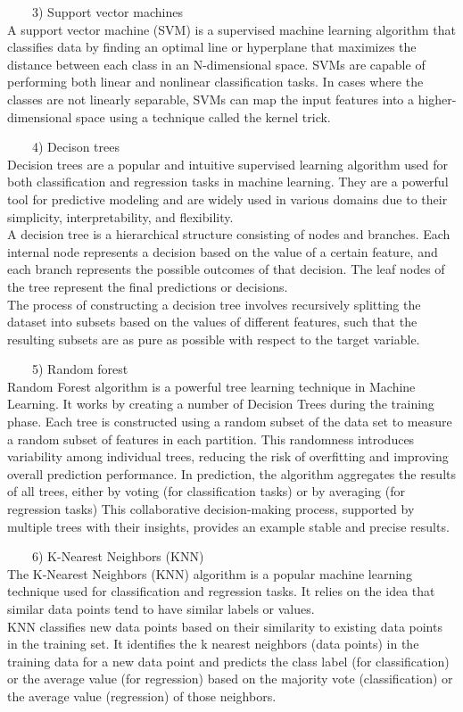 \documentclass[
]{book}
\begin{document}
~~~~3) Support vector machines\\
A support vector machine (SVM) is a supervised machine learning algorithm that classifies data by finding an optimal line or hyperplane that maximizes the distance between each class in an N-dimensional space.
SVMs are capable of performing both linear and nonlinear classification tasks. In cases where the classes are not linearly separable, SVMs can map the input features into a higher-dimensional space using a technique called the kernel trick.

~~~~4) Decison trees\\
Decision trees are a popular and intuitive supervised learning algorithm used for both classification and regression tasks in machine learning. They are a powerful tool for predictive modeling and are widely used in various domains due to their simplicity, interpretability, and flexibility.\\
A decision tree is a hierarchical structure consisting of nodes and branches. Each internal node represents a decision based on the value of a certain feature, and each branch represents the possible outcomes of that decision. The leaf nodes of the tree represent the final predictions or decisions.\\
The process of constructing a decision tree involves recursively splitting the dataset into subsets based on the values of different features, such that the resulting subsets are as pure as possible with respect to the target variable.

~~~~5) Random forest\\
Random Forest algorithm is a powerful tree learning technique in Machine Learning. It works by creating a number of Decision Trees during the training phase. Each tree is constructed using a random subset of the data set to measure a random subset of features in each partition. This randomness introduces variability among individual trees, reducing the risk of overfitting and improving overall prediction performance. In prediction, the algorithm aggregates the results of all trees, either by voting (for classification tasks) or by averaging (for regression tasks) This collaborative decision-making process, supported by multiple trees with their insights, provides an example stable and precise results.

~~~~6) K-Nearest Neighbors (KNN)\\
The K-Nearest Neighbors (KNN) algorithm is a popular machine learning technique used for classification and regression tasks. It relies on the idea that similar data points tend to have similar labels or values.\\
KNN classifies new data points based on their similarity to existing data points in the training set. It identifies the k nearest neighbors (data points) in the training data for a new data point and predicts the class label (for classification) or the average value (for regression) based on the majority vote (classification) or the average value (regression) of those neighbors.
\end{document}
